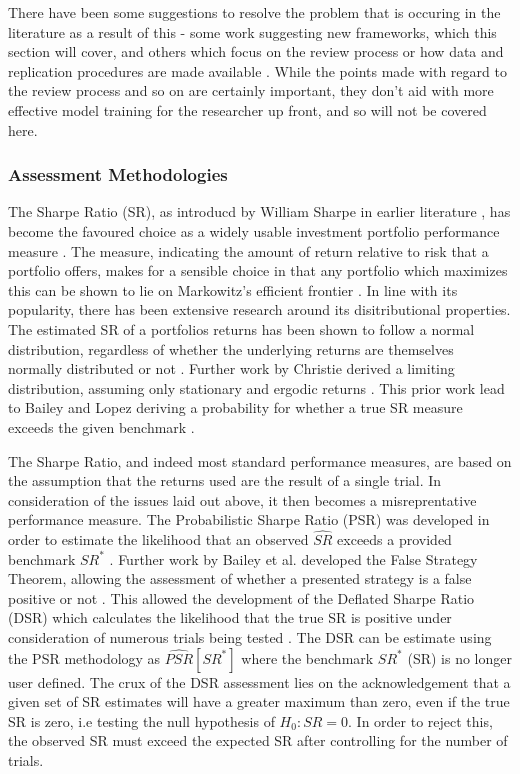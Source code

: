 \documentclass[a4paper,11pt,oneside]{article}
\theoremstyle{plain}
\theoremstyle{definition}
\begin{document}
There have been some suggestions to resolve the problem that is occuring in the literature as a result of this - some 
work suggesting new frameworks, which this section will cover, and others which focus on the review process or 
how data and replication procedures are made available \cite{Prado}. While the points made with regard to the review process 
and so on are certainly important, they don't aid with more effective model training for the researcher up front, and 
so will not be covered here.

\subsubsection{Assessment Methodologies}\label{lr_cscv}


The Sharpe Ratio (SR), as introducd by William Sharpe in earlier literature , has become the favoured choice as a widely usable
investment portfolio performance measure . The measure, indicating the amount of return relative to risk that a portfolio offers, makes for 
a sensible choice in that any portfolio which maximizes this can be shown to lie on Markowitz's efficient frontier . In line with its popularity, there has been 
extensive research around its disitributional properties. The estimated SR of a portfolios returns has been shown to follow a normal distribution, regardless
of whether the underlying returns are themselves normally distributed or not . Further work by Christie derived a limiting distribution, assuming only stationary and ergodic returns . This prior work lead to Bailey and Lopez deriving a probability for whether a true SR measure exceeds the given benchmark .
\hfill \break 

The Sharpe Ratio, and indeed most standard performance measures, are based on the assumption that the returns used are the result of a single trial. In consideration of the issues laid out above, it then becomes a misreprentative performance measure. The Probabilistic Sharpe Ratio (PSR) was developed in order to estimate the likelihood that an observed $\widehat{SR}$ exceeds a provided benchmark $SR^{*}$ . Further work by Bailey et al. developed the False Strategy Theorem, allowing the assessment of whether a presented strategy is a false positive or not . This allowed the development of the Deflated Sharpe Ratio (DSR) which calculates the likelihood that the true SR is positive under consideration of numerous trials being tested . The DSR can be estimate using the PSR methodology as $\widehat{PSR}[SR^*]$ where the benchmark $SR^{*}$ (SR) is no longer user defined. The crux of the DSR assessment lies on the acknowledgement that a given set of SR estimates will have a greater maximum than zero, even if the true SR is zero, i.e testing the null hypothesis of $H_0:SR=0$. In order to reject this, the observed SR must exceed the expected SR after controlling for the number of trials.
\hfill \break 
\end{document}
